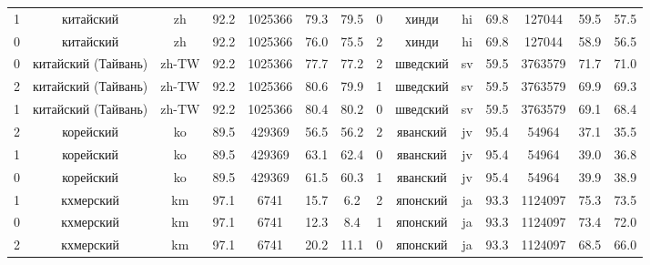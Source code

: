 \begin{table*}
{\begin{tabular}{|c|c|c|c|c|c|c|||c|c|c|c|c|c|c|}
1 & китайский & zh & 92.2 & 1025366 & 79.3 & 79.5 & 0 & хинди & hi & 69.8 & 127044 & 59.5 & 57.5\\
0 & китайский & zh & 92.2 & 1025366 & 76.0 & 75.5 & 2 & хинди & hi & 69.8 & 127044 & 58.9 & 56.5\\
0 & китайский (Тайвань) & zh-TW & 92.2 & 1025366 & 77.7 & 77.2 & 2 & шведский & sv & 59.5 & 3763579 & 71.7 & 71.0\\
2 & китайский (Тайвань) & zh-TW & 92.2 & 1025366 & 80.6 & 79.9 & 1 & шведский & sv & 59.5 & 3763579 & 69.9 & 69.3\\
1 & китайский (Тайвань) & zh-TW & 92.2 & 1025366 & 80.4 & 80.2 & 0 & шведский & sv & 59.5 & 3763579 & 69.1 & 68.4\\
2 & корейский & ko & 89.5 & 429369 & 56.5 & 56.2 & 2 & яванский & jv & 95.4 & 54964 & 37.1 & 35.5\\
1 & корейский & ko & 89.5 & 429369 & 63.1 & 62.4 & 0 & яванский & jv & 95.4 & 54964 & 39.0 & 36.8\\
0 & корейский & ko & 89.5 & 429369 & 61.5 & 60.3 & 1 & яванский & jv & 95.4 & 54964 & 39.9 & 38.9\\
1 & кхмерский & km & 97.1 & 6741 & 15.7 & 6.2 & 2 & японский & ja & 93.3 & 1124097 & 75.3 & 73.5\\
0 & кхмерский & km & 97.1 & 6741 & 12.3 & 8.4 & 1 & японский & ja & 93.3 & 1124097 & 73.4 & 72.0\\
2 & кхмерский & km & 97.1 & 6741 & 20.2 & 11.1 & 0 & японский & ja & 93.3 & 1124097 & 68.5 & 66.0\\ \hline
\end{tabular}
}
\end{table*}
%
%
%
